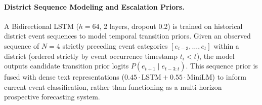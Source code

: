 \documentclass[11pt,a4paper]{article}
\begin{document}
\paragraph{District Sequence Modeling and Escalation Priors.}
A Bidirectional LSTM ($h=64$, 2 layers, dropout 0.2) is trained on historical district event sequences to model temporal transition priors. Given an observed sequence of $N=4$ strictly preceding event categories $[e_{t-3}, \dots, e_t]$ within a district (ordered strictly by event occurrence timestamp $t_i < t$), the model outputs candidate transition prior logits $P(e_{t+1} \mid e_{t-3:t})$. This sequence prior is fused with dense text representations ($0.45 \cdot \text{LSTM} + 0.55 \cdot \text{MiniLM}$) to inform current event classification, rather than functioning as a multi-horizon prospective forecasting system.
\end{document}
